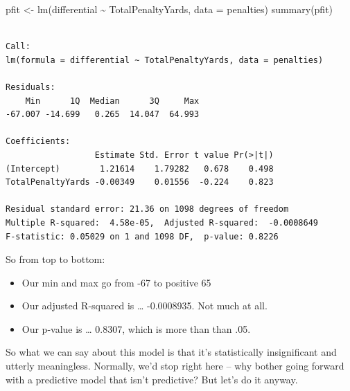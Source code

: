 \documentclass[
  letterpaper,
  DIV=11,
  numbers=noendperiod]{scrreprt}
\newenvironment{Shaded}{\begin{snugshade}}{\end{snugshade}}
\newcommand{\AttributeTok}[1]{\textcolor[rgb]{0.40,0.45,0.13}{#1}}
\newcommand{\FunctionTok}[1]{\textcolor[rgb]{0.28,0.35,0.67}{#1}}
\newcommand{\NormalTok}[1]{\textcolor[rgb]{0.00,0.23,0.31}{#1}}
\newcommand{\OtherTok}[1]{\textcolor[rgb]{0.00,0.23,0.31}{#1}}
\newcommand{\SpecialCharTok}[1]{\textcolor[rgb]{0.37,0.37,0.37}{#1}}
\providecommand{\tightlist}{%
  \setlength{\itemsep}{0pt}\setlength{\parskip}{0pt}}\usepackage{longtable,booktabs,array}
\begin{document}
\begin{Shaded}
\begin{Highlighting}[]
\NormalTok{pfit }\OtherTok{\textless{}{-}} \FunctionTok{lm}\NormalTok{(differential }\SpecialCharTok{\textasciitilde{}}\NormalTok{ TotalPenaltyYards, }\AttributeTok{data =}\NormalTok{ penalties)}
\FunctionTok{summary}\NormalTok{(pfit)}
\end{Highlighting}
\end{Shaded}

\begin{verbatim}

Call:
lm(formula = differential ~ TotalPenaltyYards, data = penalties)

Residuals:
    Min      1Q  Median      3Q     Max 
-67.007 -14.699   0.265  14.047  64.993 

Coefficients:
                  Estimate Std. Error t value Pr(>|t|)
(Intercept)        1.21614    1.79282   0.678    0.498
TotalPenaltyYards -0.00349    0.01556  -0.224    0.823

Residual standard error: 21.36 on 1098 degrees of freedom
Multiple R-squared:  4.58e-05,  Adjusted R-squared:  -0.0008649 
F-statistic: 0.05029 on 1 and 1098 DF,  p-value: 0.8226
\end{verbatim}

So from top to bottom:

\begin{itemize}
\tightlist
\item
  Our min and max go from -67 to positive 65
\item
  Our adjusted R-squared is \ldots{} -0.0008935. Not much at all.
\item
  Our p-value is \ldots{} 0.8307, which is more than than .05.
\end{itemize}

So what we can say about this model is that it's statistically
insignificant and utterly meaningless. Normally, we'd stop right here --
why bother going forward with a predictive model that isn't predictive?
But let's do it anyway.

\begin{Shaded}
\end{Shaded}
\end{document}
